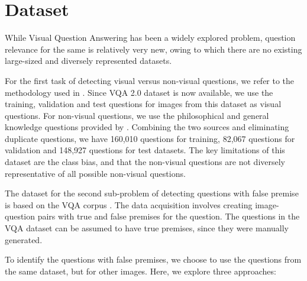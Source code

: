 \section{Dataset}

While Visual Question Answering has been a widely explored problem, question relevance for the same is relatively very new, owing to which there are no existing large-sized and diversely represented datasets. 




For the first task of detecting visual versus non-visual questions, we refer to the methodology used in \cite{ray2016question}. Since VQA 2.0 dataset \cite{goyal2016making} is now available, we use the training, validation and test questions for images from this dataset as visual questions. For non-visual questions, we use the philosophical and general knowledge questions provided by \cite{ray2016question}. Combining the two sources and eliminating duplicate questions, we have 
160,010 questions for training, 82,067 questions for validation and 148,927 questions for test datasets. The key limitations of this dataset are the class bias, and that the non-visual questions are not diversely representative of all possible non-visual questions.

The dataset for the second sub-problem of detecting questions with false premise is based on the VQA corpus \cite{AntolALMBZP15}. The data acquisition involves creating image-question pairs with true and false premises for the question. The questions in the VQA dataset can be assumed to have true premises, since they were manually generated.

To identify the questions with false premises, we choose to use the questions from the same dataset, but for other images. Here, we explore three approaches:

